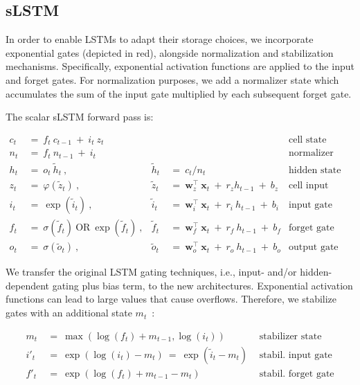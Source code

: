 \subsection{sLSTM}
\label{sec:sLSTM}

In order to enable LSTMs to adapt their storage choices, we incorporate exponential gates (depicted in red), alongside normalization and stabilization mechanisms. Specifically, exponential activation functions are applied to the input and forget gates. For normalization purposes, we add a normalizer state which accumulates the sum of the input gate multiplied by each subsequent forget gate.

The scalar sLSTM forward pass is:

\begin{align}
\label{eq:slstmforward}
c_t \ &= \  f_t \ c_{t-1} \ + \ i_t \ z_t & & 
 &\text{cell state} \\
n_t \ &= \  f_t \ n_{t-1} \ + \ i_t  & & 
 &\text{normalizer state} \\
h_t \ &= \ o_t \ \tilde{h}_t \ ,
  &\tilde{h}_t \ &= \ c_t / n_t
&\text{hidden state} \\
z_t \ &= \ \varphi \left( \tilde{z}_t \right) \ , 
  &\tilde{z}_t \ &=  \ \mathbf{w}^\top_{z} \ \mathbf{x}_t \ + \
  r_{z}  h_{t-1} \ + \  b_{z}
  &\text{cell input} \\
i_t \ &= \ \!\exp \left( \tilde{i}_t  \right) \ , 
  &\tilde{i}_t \ &= \ \mathbf{w}^\top_{i} \ \mathbf{x}_t \ + \
  r_{i}  \ h_{t-1} \ + \  b_{i}
  &\text{input gate} \\
f_t \ &= \ \sigma \left(  \tilde{f}_t \right) \ \text{OR} \
\!\exp \left(  \tilde{f}_t \right) \ ,
  &\tilde{f}_t \ &= \ \mathbf{w}^\top_{f} \ \mathbf{x}_t  \ + \
  r_{f}  \ h_{t-1} \ + \  b_{f}
  &\text{forget gate} \\
o_t \ &= \ \sigma \left( \tilde{o}_t \right) \ , 
  &\tilde{o}_t  \ &= \ \mathbf{w}^\top_{o} \ \mathbf{x}_t \ + \
  r_{o}  \ h_{t-1} \ + \  b_{o}
  &\text{output gate} 
\end{align}

We transfer the original LSTM gating techniques, i.e., input- and/or hidden-dependent gating plus bias term, to the new architectures. Exponential activation functions can lead to large values that cause overflows. Therefore, we stabilize gates with an additional state \mbox{$m_t$~\citep{Milakov:18arxiv}}:

\begin{align}
\label{eq:slstmstabil}
m_t \ &= \ \max \left( \log ( f_t ) + m_{t-1} , \log ( i_t ) \right) &\text{stabilizer state} \\
i'_t \ &= \ \!\exp \left( \log \left ( i_t \right) - m_t \right) \ = \ \!\exp \left( \tilde{i}_t - m_t \right) \ \, 
  &\text{stabil. input gate} \\
f'_t \ &= \ \!\exp \left( \log \left( f_t \right) + m_{t-1} - m_t \right) \ \, 
  &\text{stabil. forget gate}
\end{align}

